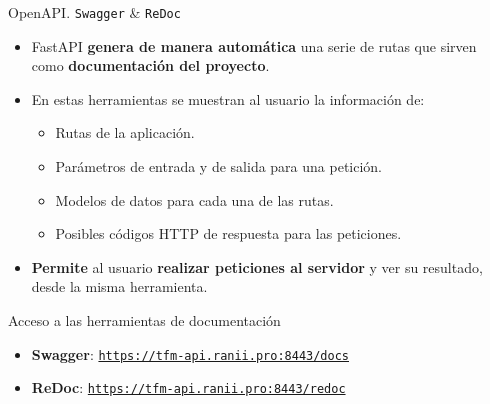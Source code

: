 \documentclass[aspectratio=169,xcolor=dvipsnames]{beamer}
\begin{document}
	\begin{frame}{OpenAPI. \texttt{Swagger} \& \texttt{ReDoc}}
		\begin{itemize}
			\item FastAPI \textbf{genera de manera automática} una serie de rutas que sirven como \textbf{documentación del proyecto}.
			
			\item En estas herramientas se muestran al usuario la información de: 
			
			\begin{itemize}
				\item Rutas de la aplicación.
				
				\item Parámetros de entrada y de salida para una petición.
				
				\item Modelos de datos para cada una de las rutas.
				
				\item Posibles códigos HTTP de respuesta para las peticiones.
			\end{itemize}
		
			\item \textbf{Permite} al usuario \textbf{realizar peticiones al servidor} y ver su resultado, desde la misma herramienta.
		\end{itemize}
		
		\begin{block}{Acceso a las herramientas de documentación}
			\begin{itemize}
				\item \textbf{Swagger}: \href{https://tfm-api.ranii.pro:8443/docs}{\texttt{https://tfm-api.ranii.pro:8443/docs}}
				
				\item \textbf{ReDoc}: \href{https://tfm-api.ranii.pro:8443/redoc}{\texttt{https://tfm-api.ranii.pro:8443/redoc}}
			\end{itemize}
		\end{block}
	\end{frame}
	
	
\end{document}
